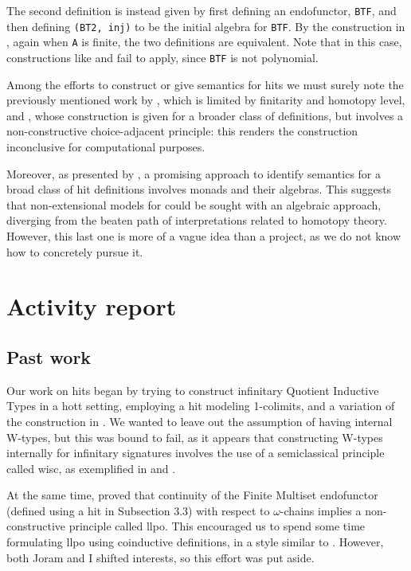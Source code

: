 \documentclass[a4paper]{article}
\begin{document}
The second definition is instead given by first defining an endofunctor, \texttt{BTF}, and then defining \texttt{(BT2, inj)} to be the initial algebra for \texttt{BTF}. By the construction in \cite{Weide2019}, again when \texttt{A} is finite, the two definitions are equivalent. Note that in this case, constructions like \cite{Moerdijk2000} and \cite{Pitts2021} fail to apply, since \texttt{BTF} is not polynomial.

Among the efforts to construct or give semantics for \glspl{hit} we must surely note the previously mentioned work by \textcite{Weide2019}, which is limited by finitarity and homotopy level, and \textcite{Fiore2022}, whose construction is given for a broader class of definitions, but involves a non-constructive choice-adjacent principle: this renders the construction inconclusive for computational purposes.

Moreover, as presented by \textcite{Lumsdaine2017}, a promising approach to identify semantics for a broad class of \gls{hit} definitions involves monads and their algebras. This suggests that non-extensional models for  could be sought with an algebraic approach, diverging from the beaten path of interpretations related to homotopy theory. However, this last one is more of a vague idea than a project, as we do not know how to concretely pursue it.

\section{Activity report}

\subsection{Past work}

Our work on \glspl{hit} began by trying to construct infinitary Quotient Inductive Types in a \gls{hott} setting, employing a \gls{hit} modeling 1-colimits, and a variation of the construction in \cite{Adamek1974}. We wanted to leave out the assumption of having internal W-types, but this was bound to fail, as it appears that constructing W-types internally for infinitary signatures involves the use of a semiclassical principle called \gls{wisc}, as exemplified in \cite{Fiore2022} and \cite{Pitts2021}.

At the same time, \textcite[Theorem 7]{Joram2023} proved that continuity of the Finite Multiset endofunctor (defined using a \gls{hit} in Subsection 3.3) with respect to \(\omega\)-chains implies a non-constructive principle called \gls{llpo}. This encouraged us to spend some time formulating \gls{llpo} using coinductive definitions, in a style similar to \textcite{Capretta2016}. However, both Joram and I shifted interests, so this effort was put aside.
\end{document}

